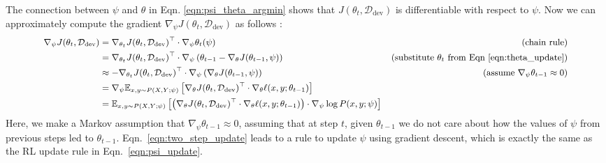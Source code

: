 The connection between $\psi$ and $\theta$ in Eqn. \ref{eqn:psi_theta_argmin} shows that $J(\theta_t, \mathcal{D}_\text{dev})$ is differentiable with respect to $\psi$. Now we can approximately compute the gradient $\nabla_\psi J(\theta_t, \mathcal{D}_\text{dev})$ as follows :
\begin{equation}
  \label{eqn:two_step_update}
   \small
  \begin{aligned}
    \nabla_\psi J(\theta_t, \mathcal{D}_\text{dev})
      &= \nabla_{\theta_t} J(\theta_t, \mathcal{D}_\text{dev})^\top \cdot \nabla_\psi \theta_t(\psi) &\text{(chain rule)} \\
      &= \nabla_{\theta_t} J(\theta_t, \mathcal{D}_\text{dev})^\top \cdot \nabla_\psi \left( \theta_{t-1} - \nabla_\theta J(\theta_{t-1}, \psi) \right) &\text{(substitute $\theta_t$ from Eqn~\ref{eqn:theta_update})} \\
      &\approx -\nabla_{\theta_t} J(\theta_t, \mathcal{D}_\text{dev})^\top \cdot \nabla_\psi  \left( \nabla_\theta J(\theta_{t-1}, \psi) \right) &\text{(assume $\nabla_\psi \theta_{t-1} \approx 0$)} \\
      &= \nabla_\psi \mathbb{E}_{x, y \sim P(X, Y; \psi)} \left[\nabla_\theta J(\theta_t, \mathcal{D}_\text{dev})^\top \cdot \nabla_\theta \ell(x, y; \theta_{t-1} )\right] \\
    &= \mathbb{E}_{x, y \sim P(X, Y; \psi)} \left[\left( \nabla_\theta J(\theta_t, \mathcal{D}_\text{dev})^\top \cdot \nabla_\theta \ell(x, y; \theta_{t-1} ) \right) \cdot \nabla_\psi \log{P(x, y; \psi)} \right]
  \end{aligned}
\end{equation}
Here, we make a Markov assumption that $\nabla_\psi \theta_{t-1} \approx 0$, assuming that at step $t$, given $\theta_{t-1}$ we do not care about how the values of $\psi$ from previous steps led to $\theta_{t-1}$. Eqn.~\ref{eqn:two_step_update} leads to a rule to update $\psi$ using gradient descent, which is exactly the same as the RL update rule in Eqn.~\ref{eqn:psi_update}.
